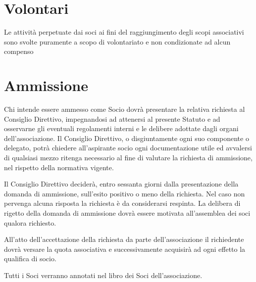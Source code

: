 \documentclass[legalpaper, 11pt]{exam}
\let\tempone\enumerate
\let\temptwo\endenumerate
\renewenvironment{enumerate}{\tempone\addtolength{\itemsep}{-0.45\baselineskip}}{\temptwo}
\begin{document}
\section{Volontari}
\begin{enumerate}
    \item Le attività perpetuate dai soci ai fini del raggiungimento degli scopi associativi sono svolte puramente a scopo di volontariato e non condizionate ad alcun compenso
\end{enumerate}

\section{Ammissione}
\begin{enumerate}
 \item Chi intende essere ammesso come Socio dovrà presentare la relativa richiesta al Consiglio Direttivo, impegnandosi ad attenersi al presente Statuto e ad osservarne gli eventuali regolamenti interni e le delibere adottate dagli organi dell’associazione. Il Consiglio Direttivo, o disgiuntamente ogni suo componente o delegato, potrà chiedere all’aspirante socio ogni documentazione utile ed avvalersi di qualsiasi mezzo ritenga necessario al fine di valutare la richiesta di ammissione, nel rispetto della normativa vigente.
 \item Il Consiglio Direttivo deciderà, entro sessanta giorni dalla presentazione della domanda di ammissione, sull’esito positivo o meno della richiesta. Nel caso non pervenga alcuna risposta la richiesta è da considerarsi respinta. La delibera di rigetto della domanda di ammissione dovrà essere motivata all’assemblea dei soci qualora richiesto.
 \item All’atto dell’accettazione della richiesta da parte dell’associazione il richiedente dovrà versare la quota associativa e successivamente acquisirà ad ogni effetto la qualifica di socio.
 \item Tutti i Soci verranno annotati nel libro dei Soci dell’associazione.
\end{enumerate}
\end{document}
